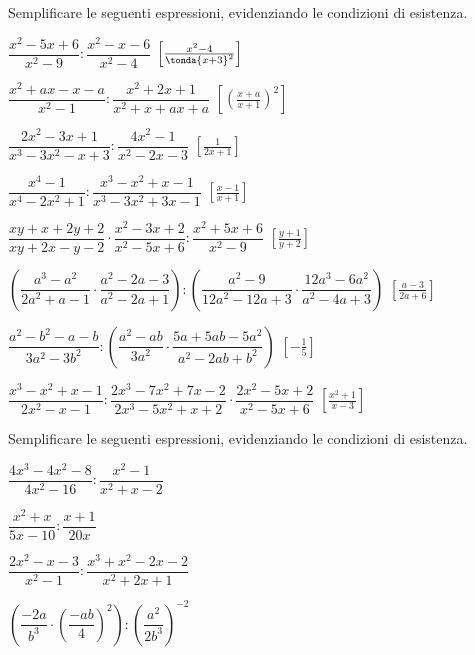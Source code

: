 \begin{esercizio}[\Ast]
\label{ese:19.19}
Semplificare le seguenti espressioni, evidenziando le condizioni di esistenza.
\begin{enumeratea}
 \item $\dfrac{x^{2}-5x+6}{x^{2}-9}:\dfrac{x^{2}-x-6}{x^{2}-4}$
  \hfill $\left[\frac{x^2-4}{\tonda{x+3}^2}\right]$
 \item $\dfrac{x^{2}+ax-x-a}{x^{2}-1}:\dfrac{x^{2}+2x+1}{x^{2}+x+ax+a}$
  \hfill $\left[\left(\frac{x+a}{x+1}\right)^{2}\right]$
 \item $\dfrac{2x^{2}-3x+1}{x^{3}-3x^{2}-x+3}:\dfrac{4x^{2}-1}{x^{2}-2x-3}$
  \hfill $\left[\frac{1}{2x+1}\right]$
 \item $\dfrac{x^{4}-1}{x^{4}-2x^{2}+1}:
        \dfrac{x^{3}-x^{2}+x-1}{x^{3}-3x^{2}+3x-1}$
  \hfill $\left[\frac{x-1}{x+1}\right]$
 \item $\dfrac{xy+x+2y+2}{xy+2x-y-2}\cdot
 \dfrac{x^{2}-3x+2}{x^{2}-5x+6}:\dfrac{x^{2}+5x+6}{x^{2}-9}$
  \hfill $\left[\frac{y+1}{y+2}\right]$
 \item $\left(\dfrac{a^{3}-a^{2}}{2a^{2}+a-1}\cdot
 \dfrac{a^{2}-2a-3}{a^{2}-2a+1}\right):
 \left(\dfrac{a^{2}-9}{12a^{2}-12a+3}\cdot
 \dfrac{12a^{3}-6a^{2}}{a^{2}-4a+3}\right)$
  \hfill $\left[\frac{a-3}{2a+6}\right]$
 \item $\dfrac{a^{2}-b^{2}-a-b}{3a^{2}-3b^{2}}:
 \left(\dfrac{a^{2}-ab}{3a^{2}}\cdot
 \dfrac{5a+5ab-5a^{2}}{a^{2}-2ab+b^{2}}\right)$
  \hfill $\left[-{\frac{1}{5}}\right]$
 \item $\dfrac{x^{3}-x^{2}+x-1}{2x^{2}-x-1}:
 \dfrac{2x^{3}-7x^{2}+7x-2}{2x^{3}-5x^{2}+x+2}\cdot
 \dfrac{2x^{2}-5x+2}{x^{2}-5x+6}$
  \hfill $\left[\frac{x^{2}+1}{x-3}\right]$
\end{enumeratea}
\end{esercizio}

\begin{esercizio}
\label{ese:19.21}
Semplificare le seguenti espressioni, evidenziando le condizioni di esistenza.
\begin{multicols}{2}
\begin{enumeratea}
 \item $\dfrac{4x^{3}-4x^{2}-8}{4x^{2}-16}:\dfrac{x^{2}-1}{x^{2}+x-2}$
 \item $\dfrac{x^{2}+x}{5x-10}:\dfrac{x+1}{20x}$
 \item $\dfrac{2x^{2}-x-3}{x^{2}-1}:\dfrac{x^{3}+x^{2}-2x-2}{x^{2}+2x+1}$
 \item $\left(\dfrac{-{2a}}{b^{3}}\cdot
        \left(\dfrac{-{ab}}{4}\right)^{2}\right):
        \left(\dfrac{a^{2}}{2b^{3}}\right)^{-2}$%
\end{enumeratea}
\end{multicols}
\end{esercizio}

